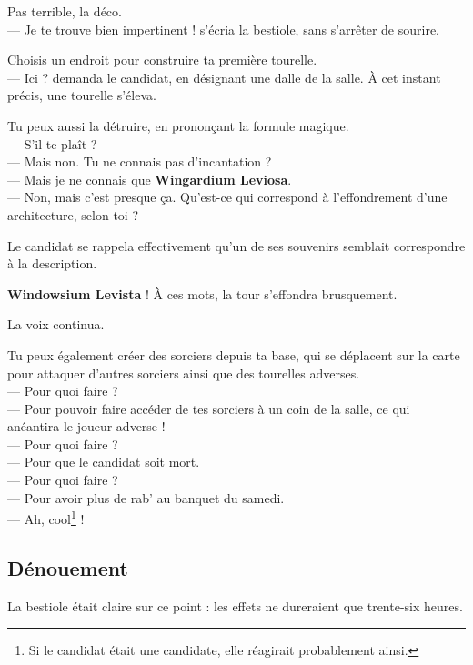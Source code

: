 \noindent
\og Pas terrible, la déco.\\
--- Je te trouve bien impertinent ! \fg{} s'écria la bestiole, sans s'arrêter de sourire.

\noindent
\og Choisis un endroit pour construire ta première tourelle.\\
--- Ici ? \fg{} demanda le candidat, en désignant une dalle de la salle. À cet instant précis, une tourelle s'éleva.

\noindent
\og Tu peux aussi la détruire, en prononçant la formule magique.\\
--- \og S'il te plaît \fg{} ?\\
--- Mais non. Tu ne connais pas d'incantation ?\\
--- Mais je ne connais que \og \textbf{Wingardium Leviosa}. \fg\\
--- Non, mais c'est presque ça. Qu'est-ce qui correspond à l'effondrement d'une architecture, selon toi ? \fg

Le candidat se rappela effectivement qu'un de ses souvenirs semblait correspondre à la description.

\noindent
\og \textbf{Windowsium Levista} ! \fg{} À ces mots, la tour s'effondra brusquement.

La voix continua.

\noindent
\og Tu peux également créer des sorciers depuis ta base, qui se déplacent sur la carte pour attaquer d'autres sorciers ainsi que des tourelles adverses.\\
--- Pour quoi faire ?\\
--- Pour pouvoir faire accéder de tes sorciers à un coin de la salle, ce qui anéantira le joueur adverse !\\
--- Pour quoi faire ?\\
--- Pour que le candidat soit mort.\\
--- Pour quoi faire ?\\
--- Pour avoir plus de rab' au banquet du samedi.\\
--- Ah, cool\footnote{Si le candidat était une candidate, elle réagirait probablement ainsi.} !\fg

\subsection{Dénouement}

La bestiole était claire sur ce point : les effets ne dureraient que trente-six heures.